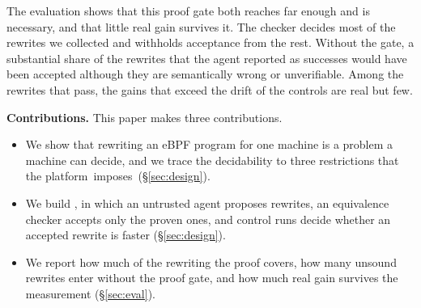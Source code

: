 The evaluation shows that this proof gate both reaches far enough and is necessary, and that little real gain survives it.
The checker decides most of the rewrites we collected and withholds acceptance from the rest.
Without the gate, a substantial share of the rewrites that the agent reported as successes would have been accepted although they are semantically wrong or unverifiable.
Among the rewrites that pass, the gains that exceed the drift of the controls are real but few.

\noindent\textbf{Contributions.}
This paper makes three contributions.
\begin{itemize}
\item We show that rewriting an eBPF program for one machine is a problem a machine can decide, and we trace the decidability to three restrictions that the platform~imposes~(\S\ref{sec:design}).
\item We build \sys, in which an untrusted agent proposes rewrites, an equivalence checker accepts only the proven ones, and control runs decide whether an accepted rewrite is faster (\S\ref{sec:design}).
\item We report how much of the rewriting the proof covers, how many unsound rewrites enter without the proof gate, and how much real gain survives the measurement (\S\ref{sec:eval}).
\end{itemize}